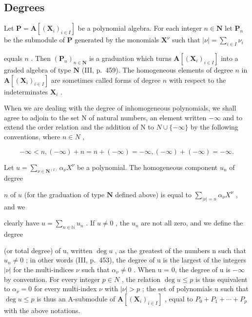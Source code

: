\subsection{Degrees}

Let \(\mathbf{P} = \mathbf{A}[(\mathbf{X}_i)_{i\in I}]\) be a polynomial algebra. For each integer \(n\in \mathbf{N}\) let \(\mathbf{P}_n\) be the submodule of \(\mathbf{P}\) generated by the monomials \(\mathbf{X}^{\nu}\) such that \(|\nu| = \sum_{i\in I}\nu_i\)

equals \(n\) . Then \((\mathbf{P}_n)_{n \in \mathbf{N}}\) is a graduation which turns \(\mathbf{A}[(\mathbf{X}_i)_{i \in I}]\) into a graded algebra of type \(\mathbf{N}\) (III, p.~459). The homogeneous elements of degree \(n\) in \(\mathbf{A}[(\mathbf{X}_i)_{i \in I}]\) are sometimes called forms of degree \(n\) with respect to the indeterminates \(\mathbf{X}_i\) .

When we are dealing with the degree of inhomogeneous polynomials, we shall agree to adjoin to the set N of natural numbers, an element written \(-\infty\) and to extend the order relation and the addition of N to \(N \cup \{-\infty\}\) by the following conventions, where \(n \in N\) ,

\[
- \infty <   n, (- \infty) + n = n + (- \infty) = - \infty , (- \infty) + (- \infty) = - \infty .
\]

Let \(u = \sum_{\nu \in \mathbf{N}^{(I)}} \alpha_{\nu} X^{\nu}\) be a polynomial. The homogeneous component \(u_{n}\) of degree

\(n\) of \(u\) (for the graduation of type \(\mathbf{N}\) defined above) is equal to \(\sum_{|\nu| = n} \alpha_{\nu} X^{\nu}\) , and we

clearly have \(u = \sum_{n \in \mathbb{N}} u_n\) . If \(u \neq 0\) , the \(u_n\) are not all zero, and we define the degree

(or total degree) of u, written \(\deg u\) , as the greatest of the numbers n such that \(u_{n} \neq 0\) ; in other words (III, p.~453), the degree of u is the largest of the integers \(|\nu|\) for the multi-indices \(\nu\) such that \(\alpha_{\nu} \neq 0\) . When u = 0, the degree of u is \(-\infty\) by convention. For every integer \(p \in N\) , the relation \(\deg u \leqslant p\) is thus equivalent to \(\alpha_{\nu} = 0\) for every multi-index \(\nu\) with \(|\nu| > p\) ; the set of polynomials u such that \(\deg u \leqslant p\) is thus an A-submodule of \(\mathbf{A}[(\mathbf{X}_{i})_{i \in I}]\) , equal to \(P_{0} + P_{1} + \cdots + P_{p}\) with the above notations.

